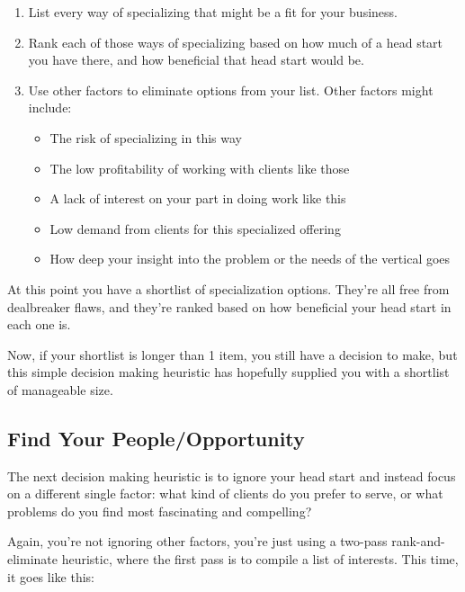\begin{enumerate}
\item List every way of specializing that might be a fit for your business.
\item Rank each of those ways of specializing based on how much of a head start you have there, and how beneficial that head start would be.
\item Use other factors to eliminate options from your list. Other factors might include:


\begin{itemize}
\item The risk of specializing in this way
\item The low profitability of working with clients like those
\item A lack of interest on your part in doing work like this
\item Low demand from clients for this specialized offering
\item How deep your insight into the problem or the needs of the vertical goes
\end{itemize}
\end{enumerate}

At this point you have a shortlist of specialization options. They're all free from dealbreaker flaws, and they're ranked based on how beneficial your head start in each one is.

Now, if your shortlist is longer than 1 item, you still have a decision to make, but this simple decision making heuristic has hopefully supplied you with a shortlist of manageable size.

\subsection{\textbf{Find Your People/Opportunity}}

The next decision making heuristic is to ignore your head start and instead focus on a different single factor: what kind of clients do you prefer to serve, or what problems do you find most fascinating and compelling?

Again, you're not ignoring other factors, you're just using a two-pass rank-and-eliminate heuristic, where the first pass is to compile a list of interests. This time, it goes like this:

